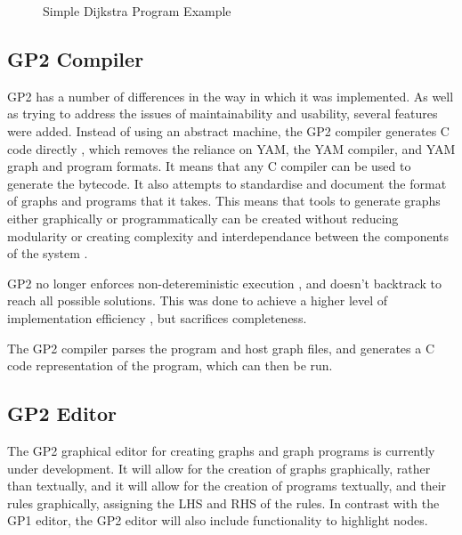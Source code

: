 \documentclass{UoYCSproject}
\begin{document}
\begin{figure}
\caption{Simple Dijkstra Program Example}
\end{figure}

\restoregeometry

\subsection{GP2 Compiler}
GP2 has a number of differences in the way in which it was implemented. As well as trying to address the issues of maintainability and usability, several features were added.
Instead of using an abstract machine, the GP2 compiler generates C code directly \cite{chris_compiler}, which removes the reliance on YAM, the YAM compiler, and YAM graph and program formats. It means that any C compiler can be used to generate the bytecode. It also attempts to standardise and document the format of graphs and programs that it takes. This means that tools to generate graphs either graphically or programmatically can be created without reducing modularity or creating complexity and interdependance between the components of the system \cite{gp2_ide}.

GP2 no longer enforces non-detereministic execution \cite[p. 15]{gp2_ide}, and doesn't backtrack to reach all possible solutions. This was done to achieve a higher level of implementation efficiency \cite[p. 15]{chris_compiler}, but sacrifices completeness.

The GP2 compiler parses the program and host graph files, and generates a C code representation of the program, which can then be run.

\subsection{GP2 Editor}
The GP2 graphical editor for creating graphs and graph programs is currently under development. It will allow for the creation of graphs graphically, rather than textually, and it will allow for the creation of programs textually, and their rules graphically, assigning the LHS and RHS of the rules. In contrast with the GP1 editor, the GP2 editor will also include functionality to highlight nodes.
\end{document}
